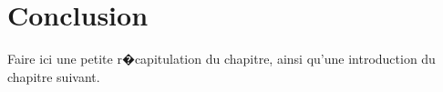 \begin{spacing}{1.2}
\begin{itemize}
\end{itemize}
 
\section*{Conclusion}
Faire ici une petite r�capitulation du chapitre, ainsi qu'une introduction du chapitre suivant.





\end{spacing}
